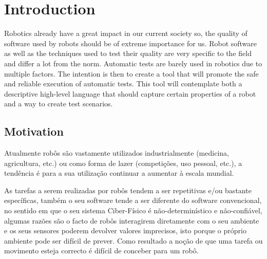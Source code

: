 \chapter{Introduction}
\label{chap:introduction}

Robotics already have a great impact in our current society so, 
the quality of software used by robots should be of extreme importance for us.
Robot software as well as the techniques used to test their quality are 
very specific to the field and differ a lot from the norm.
Automatic tests are barely used in robotics due to multiple factors.
The intention is then to create a tool that will promote the safe 
and reliable execution of automatic tests.
This tool will contemplate both a descriptive high-level language 
that should capture certain properties of a robot and a way to create test scenarios.

\section{Motivation}
\label{sec:motivation}
Atualmente robôs são vastamente utilizados industrialmente (medicina, agricultura, etc.) ou como 
forma de lazer (competições, uso pessoal, etc.), a tendência é para a sua utilização continuar a 
aumentar à escala mundial. 


As tarefas a serem realizadas por robôs tendem a ser repetitivas e/ou 
bastante específicas, também o seu software tende a ser diferente do software convencional, no 
sentido em que o seu sistema Ciber-Físico é não-determinístico e não-confiável, algumas razões são o 
facto de robôs interagirem diretamente com o seu ambiente e os seus sensores poderem devolver valores 
imprecisos, isto porque o próprio ambiente pode ser difícil de prever. Como resultado a noção de que 
uma tarefa ou movimento esteja correcto é difícil de conceber para um robô. 




